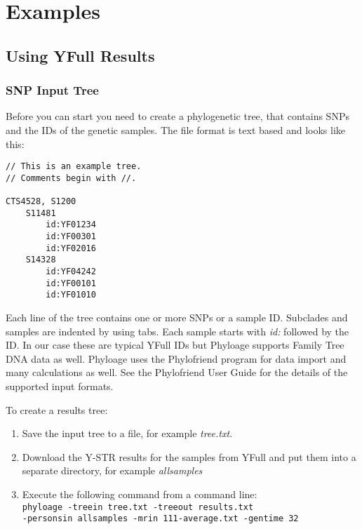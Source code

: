 \section{Examples}

\subsection{Using YFull Results}

\subsubsection*{SNP Input Tree}

Before you can start you need to create a phylogenetic tree,
that contains SNPs and the IDs of the genetic samples. The
file format is text based and looks like this:

\begin{verbatim}
// This is an example tree.
// Comments begin with //.

CTS4528, S1200
    S11481
        id:YF01234
        id:YF00301
        id:YF02016
    S14328
        id:YF04242
        id:YF00101
        id:YF01010
\end{verbatim}

Each line of the tree contains one or more SNPs or a sample
ID. Subclades and samples are indented by using tabs. Each
sample starts with \emph{id:} followed by the ID. In our case
these are typical YFull IDs but Phyloage supports Family Tree
DNA data as well. Phyloage uses the Phylofriend
\cite{Phylofriend} program for data import and many
calculations as well. See the Phylofriend User Guide
\cite{PhylofriendUserGuide} for the details of the supported
input formats.

To create a results tree:

\begin{enumerate}
\item Save the input tree to a file, for example \emph{tree.txt}.
\item Download the Y-STR results for the samples from YFull
	and put them into a separate directory, for example
	\emph{allsamples}
\item Execute the following command from a command line:\\
\texttt{phyloage -treein tree.txt -treeout results.txt\\
-personsin allsamples -mrin 111-average.txt -gentime 32}
\end{enumerate}

